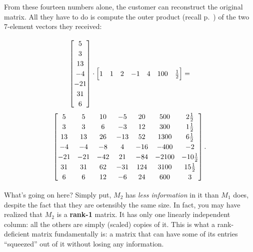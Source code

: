 \begin{alttitles}
\begin{compactenum}
\end{compactenum}


From these fourteen numbers alone, the customer can reconstruct the original
matrix. All they have to do is compute the outer product (recall
p.~\pageref{outerProduct}) of the two 7-element vectors they received:

\vspace{-.15in}
\begin{gather*}
\begin{bmatrix}
5 \\ 3 \\ 13 \\ -4 \\ -21 \\ 31 \\ 6 \\
\end{bmatrix} \cdot
\begin{bmatrix}
1 & 1 & 2 & -1 & 4 & 100 & \frac{1}{2} \\
\end{bmatrix} =\\
\begingroup
\renewcommand*{\arraystretch}{1.2}
\begin{bmatrix}
5 & 5 & 10 & -5 & 20 & 500 & 2\frac{1}{2} \\
3 & 3 & 6 & -3 & 12 & 300 & 1\frac{1}{2} \\
13 & 13 & 26 & -13 & 52 & 1300 & 6\frac{1}{2} \\
-4 & -4 & -8 & 4 & -16 & -400 & -2 \\
-21 & -21 & -42 & 21 & -84 & -2100 & -10\frac{1}{2} \\
31 & 31 & 62 & -31 & 124 & 3100 & 15\frac{1}{2} \\
6 & 6 & 12 & -6 & 24 & 600 & 3 \\
\end{bmatrix}.
\endgroup
\end{gather*}
\vspace{-.15in}

\medskip
\label{rank-deficient}

What's going on here? Simply put, $M_2$ has \textit{less information} in it
than $M_1$ does, despite the fact that they are ostensibly the same size. In
fact, you may have realized that $M_2$ is a \textbf{rank-1} matrix. It has only
one linearly independent column: all the others are simply (scaled) copies of
it. This is what a rank-deficient matrix fundamentally is: a matrix that can
have some of its entries ``squeezed'' out of it without losing any information.


\end{alttitles}
